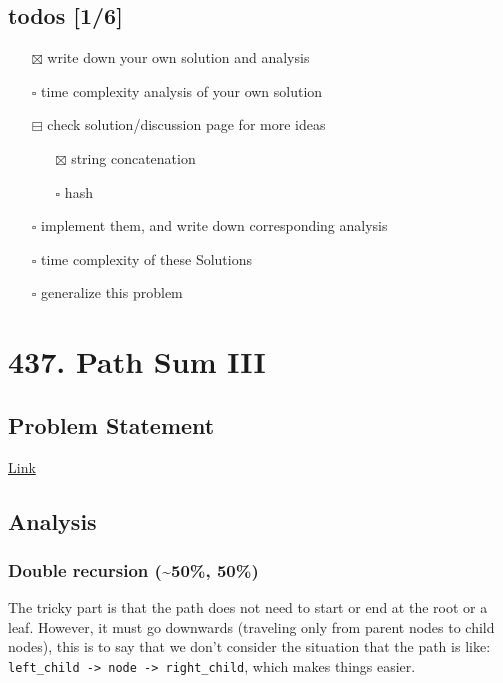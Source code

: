 \documentclass[11pt]{article}
\begin{document}
\subsection{todos [1/6]}
\label{sec:org36f7ea8}
\begin{itemize}
\item[{$\boxtimes$}] write down your own solution and analysis
\item[{$\square$}] time complexity analysis of your own solution
\item[{$\boxminus$}] check solution/discussion page for more ideas
\begin{itemize}
\item[{$\boxtimes$}] string concatenation
\item[{$\square$}] hash
\end{itemize}
\item[{$\square$}] implement them, and write down corresponding analysis
\item[{$\square$}] time complexity of these Solutions
\item[{$\square$}] generalize this problem
\end{itemize}
\section{437. Path Sum III}
\label{sec:org79b1ad2}
\subsection{Problem Statement}
\label{sec:org1ff71c0}
\href{https://leetcode.com/problems/path-sum-iii/}{Link}
\subsection{Analysis}
\label{sec:org5b062fa}
\subsubsection{Double recursion (\textasciitilde{}50\%, 50\%)}
\label{sec:orge3456fd}
The tricky part is that the path does not need to start or end at the root or a leaf. However, it must go downwards (traveling only from parent nodes to child nodes), this is to say that we don't consider the situation that the path is like: \texttt{left\_child -> node -> right\_child}, which makes things easier.
\end{document}
